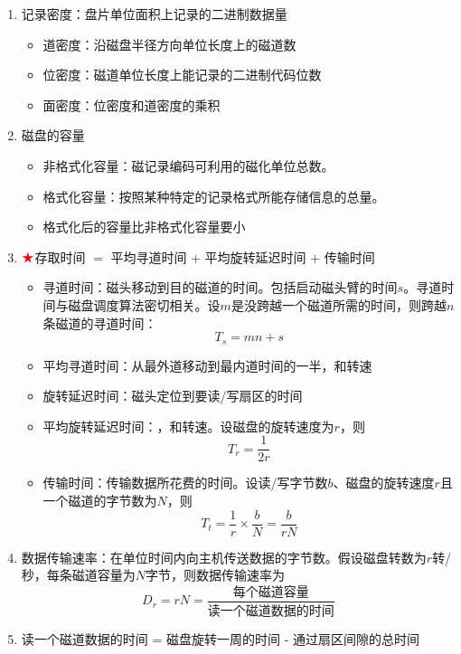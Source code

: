 \documentclass[./computer-organization-and-architecture.tex]{subfiles}
\begin{document}
    \begin{enumerate}
        \item 记录密度：盘片单位面积上记录的二进制数据量
        \begin{itemize}
            \item 道密度：沿磁盘半径方向单位长度上的磁道数
            \item 位密度：磁道单位长度上能记录的二进制代码位数
            \item 面密度：位密度和道密度的乘积
        \end{itemize}
        \item 磁盘的容量
        \begin{itemize}
            \item 非格式化容量：磁记录编码可利用的磁化单位总数。{\color{customgreen}{非格式化容量 = 记录面数 $\times$ 柱面数 $\times$ 每条磁道的磁化单位数}}
            \item 格式化容量：按照某种特定的记录格式所能存储信息的总量。{\color{customgreen}{格式化容量 = 记录面数 $\times$ 柱面数 $\times$ 每道扇区数 $\times$ 每个扇区的容量}}
            \item 格式化后的容量比非格式化容量要小
        \end{itemize}
        \item $\color{red}{\bigstar}$存取时间 $=$ 平均寻道时间 + 平均旋转延迟时间 + 传输时间
        \begin{itemize}
            \item 寻道时间：磁头移动到目的磁道的时间。包括启动磁头臂的时间$s$。寻道时间与磁盘调度算法密切相关。设$m$是没跨越一个磁道所需的时间，则跨越$n$条磁道的寻道时间：
            \[
                T_s = mn + s
            \]
            \item 平均寻道时间：从最外道移动到最内道时间的一半，和转速{\color{red}{无关}}
            \item 旋转延迟时间：磁头定位到要读/写扇区的时间
            \item 平均旋转延迟时间：{\color{red}{旋转半周的时间}}，和转速{\color{customgreen}{有关}}。设磁盘的旋转速度为$r$，则
            \[
                T_r = \frac{1}{2r}
            \]
            \item 传输时间：传输数据所花费的时间。设读/写字节数$b$、磁盘的旋转速度$r$且一个磁道的字节数为$N$，则
            \[
                T_t = \frac{1}{r}\times\frac{b}{N} = \dfrac{b}{rN}
            \]
        \end{itemize}
        \item 数据传输速率：在单位时间内向主机传送数据的字节数。假设磁盘转数为$r$转/秒，每条磁道容量为$N$字节，则数据传输速率为
        \[
            D_r = rN = \dfrac{\text{每个磁道容量}}{\text{读一个磁道数据的时间}}
        \]
        \item 读一个磁道数据的时间 = 磁盘旋转一周的时间 - 通过扇区间隙的总时间
    \end{enumerate}
\end{document}
